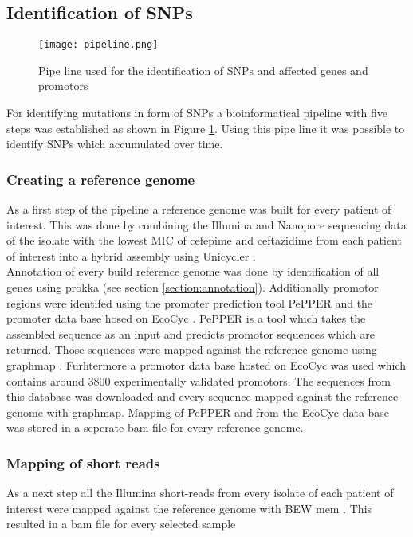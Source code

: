 \subsection{Identification of SNPs}
\begin{figure}
	\texttt{[image: pipeline.png]}
	\caption{Pipe line used for the identification of SNPs and affected genes and promotors}
	\label{figure:pipeline}
\end{figure}
For identifying mutations in form of SNPs a bioinformatical pipeline with five steps was established as shown in Figure \ref{figure:pipeline}. Using this pipe line it was possible to identify SNPs which accumulated over time. 

\subsubsection{Creating a reference genome}
As a first step of the pipeline a reference genome was built for every patient of interest. This was done by combining the Illumina and Nanopore sequencing data of the isolate with the lowest MIC of cefepime and ceftazidime from each patient of interest into a hybrid assembly using Unicycler \cite{wick_unicycler:_2017}. \\
Annotation of every build reference genome was done by identification of all genes using prokka \cite{seemann_prokka:_2014} (see section \ref{section:annotation}). Additionally promotor regions were identifed 
using the promoter prediction tool PePPER \cite{pepper} and the promoter data base hosed on EcoCyc \cite{ecocyc}. PePPER is a tool which takes the assembled sequence as an input and predicts promotor sequences which are returned. Those sequences were mapped against the reference genome using graphmap \cite{sovic_fast_2016}. Furhtermore a promotor data base hosted on EcoCyc was used which contains around 3800 experimentally validated promotors. The sequences from this database was downloaded and every sequence mapped against the reference genome with graphmap. Mapping of PePPER and from the EcoCyc data base was stored in a seperate bam-file for every reference genome. 
\label{section:annotatiion_ref}
\subsubsection{Mapping of short reads}
As a next step all the Illumina short-reads from every isolate of each patient of interest were mapped against the reference genome with BEW mem \cite{li_fast_2009}. This resulted in a bam file for every selected sample

